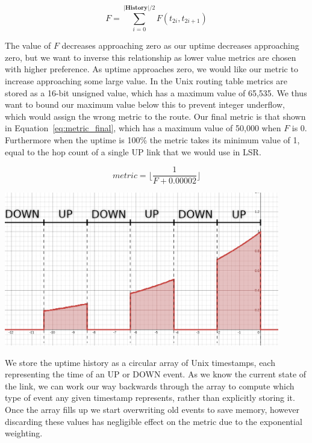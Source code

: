 \documentclass[withindex,glossary,openany]{cam-thesis}
\begin{document}
\begin{equation} \label{eq:metric_sum}
F = \sum_{i = 0}^{|\textbf{History}|/2} F(t_{2i}, t_{2i+1})
\end{equation}

The value of $F$ decreases approaching zero as our uptime decreases approaching zero, but we want to inverse this relationship as lower value metrics are chosen with higher preference. As uptime approaches zero, we would like our metric to increase approaching some large value. In the Unix routing table metrics are stored as a 16-bit unsigned value, which has a maximum value of 65,535. We thus want to bound our maximum value below this to prevent integer underflow, which would assign the wrong metric to the route. Our final metric is that shown in Equation~\ref{eq:metric_final}, which has a maximum value of 50,000 when $F$ is 0. Furthermore when the uptime is 100\% the metric takes its minimum value of 1, equal to the hop count of a single UP link that we would use in LSR.

\begin{equation} \label{eq:metric_final}
\textit{metric} = \Big\lfloor\frac{1}{F+0.00002}\Big\rfloor
\end{equation}

\begin{center}
\begin{minipage}{0.9\textwidth} \centering
	\includegraphics[width=0.9\textwidth]{metric}
	\label{fig:metric}
\end{minipage}
\end{center}

We store the uptime history as a circular array of Unix timestamps, each representing the time of an UP or DOWN event. As we know the current state of the link, we can work our way backwards through the array to compute which type of event any given timestamp represents, rather than explicitly storing it. Once the array fills up we start overwriting old events to save memory, however discarding these values has negligible effect on the metric due to the exponential weighting.
\end{document}

